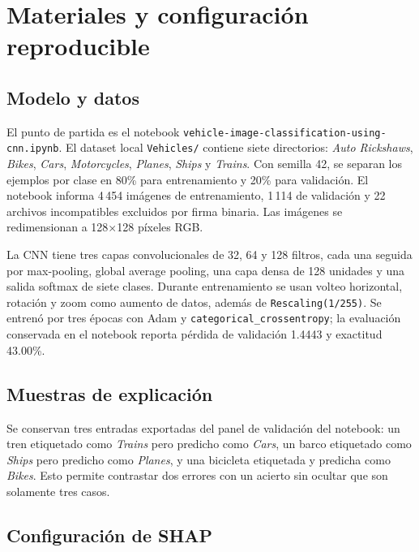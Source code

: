 \documentclass[11pt,a4paper]{article}
\begin{document}
\section{Materiales y configuración reproducible}

\subsection{Modelo y datos}

El punto de partida es el notebook
\texttt{vehicle-image-classification-using-cnn.ipynb}. El dataset local
\texttt{Vehicles/} contiene siete directorios: \textit{Auto Rickshaws},
\textit{Bikes}, \textit{Cars}, \textit{Motorcycles}, \textit{Planes},
\textit{Ships} y \textit{Trains}. Con semilla 42, se separan los ejemplos por
clase en 80\% para entrenamiento y 20\% para validación. El notebook informa
4\,454 imágenes de entrenamiento, 1\,114 de validación y 22 archivos
incompatibles excluidos por firma binaria. Las imágenes se redimensionan a
128$\times$128 píxeles RGB.

La CNN tiene tres capas convolucionales de 32, 64 y 128 filtros, cada una
seguida por max-pooling, global average pooling, una capa densa de 128
unidades y una salida softmax de siete clases. Durante entrenamiento se usan
volteo horizontal, rotación y zoom como aumento de datos, además de
\texttt{Rescaling(1/255)}. Se entrenó por tres épocas con Adam y
\texttt{categorical\_crossentropy}; la evaluación conservada en el notebook
reporta pérdida de validación 1.4443 y exactitud 43.00\%.

\subsection{Muestras de explicación}

Se conservan tres entradas exportadas del panel de validación del notebook:
un tren etiquetado como \textit{Trains} pero predicho como \textit{Cars}, un
barco etiquetado como \textit{Ships} pero predicho como \textit{Planes}, y una
bicicleta etiquetada y predicha como \textit{Bikes}. Esto permite contrastar
dos errores con un acierto sin ocultar que son solamente tres casos.

\subsection{Configuración de SHAP}
\end{document}
